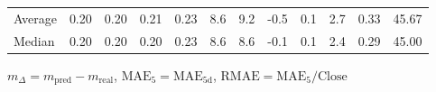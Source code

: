 \begin{threeparttable}
{\begin{tabular}{lrrrrrrrrrrr}
Average &          0.20 &          0.20 &          0.21 &        0.23 &                 8.6 &                 9.2 &       -0.5 &                 0.1 &              2.7 &            0.33 &                  45.67 \\
 Median &          0.20 &          0.20 &          0.20 &        0.23 &                 8.6 &                 8.6 &       -0.1 &                 0.1 &              2.4 &            0.29 &                  45.00 \\
\bottomrule
\end{tabular}
}
\begin{tablenotes}\footnotesize
\item $m_\Delta=m_{\text{pred}}-m_{\text{real}}$,
$\mathrm{MAE}_5=\mathrm{MAE}_{5\text{d}}$,
$\mathrm{RMAE}=\mathrm{MAE}_5/\text{Close}$
\end{tablenotes}
\end{threeparttable}
\endgroup

